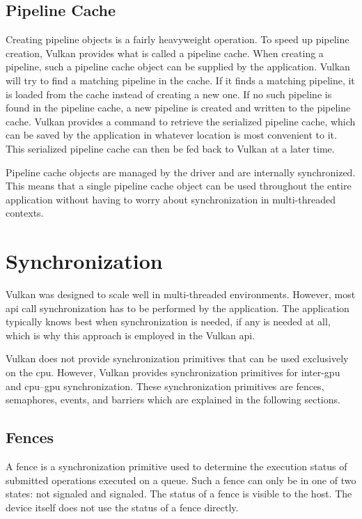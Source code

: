     \subsection{Pipeline Cache}
    \label{subsec:PipelineCache}
      Creating pipeline objects is a fairly heavyweight operation.
      To speed up pipeline creation, Vulkan provides what is called a pipeline cache.
      When creating a pipeline, such a pipeline cache object can be supplied by the \gls{application}.
      Vulkan will try to find a matching pipeline in the cache.
      If it finds a matching pipeline, it is loaded from the cache instead of creating a new one.
      If no such pipeline is found in the pipeline cache, a new pipeline is created and written to the pipeline cache.
      Vulkan provides a command to retrieve the serialized pipeline cache, which can be saved by the \gls{application} in whatever location is most convenient to it.
      This serialized pipeline cache can then be fed back to Vulkan at a later time.

      Pipeline cache objects are managed by the \gls{driver} and are internally synchronized.
      This means that a single pipeline cache object can be used throughout the entire application without having to worry about synchronization in multi-threaded contexts.


  \section{Synchronization}

    Vulkan was designed to scale well in multi-threaded environments.
    However, most \gls{api} call synchronization has to be performed by the application.
    The application typically knows best when synchronization is needed, if any is needed at all, which is why this approach is employed in the Vulkan \gls{api}.

    Vulkan does not provide synchronization primitives that can be used exclusively on the \gls{cpu}.
    However, Vulkan provides synchronization primitives for inter-\gls{gpu} and \gls{cpu}--\gls{gpu} synchronization.
    These synchronization primitives are fences, semaphores, events, and barriers which are explained in the following sections.

    \subsection{Fences}
    \label{sub:Fences}
      A fence is a synchronization primitive used to determine the execution status of submitted operations executed on a queue.
      Such a fence can only be in one of two states: not signaled and signaled.
      The status of a fence is visible to the \gls{host}.
      The device itself does not use the status of a fence directly.

